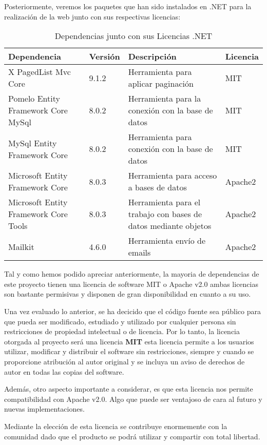 \newpage
Posteriormente, veremos los paquetes que han sido instalados en .NET para la realización de la web junto con sus respectivas licencias:

\begin{table}[H]
    \centering
    \renewcommand{\arraystretch}{1.2} %
    \begin{tabularx}{\textwidth}{X l X l}
        \hline
        \textbf{Dependencia} & \textbf{Versión} & \textbf{Descripción} & \textbf{Licencia} \\
        \hline
        X PagedList Mvc Core & 9.1.2 & Herramienta para aplicar paginación & MIT \\
        Pomelo Entity Framework Core MySql& 8.0.2 & Herramienta para la conexión con la base de datos & MIT \\
        MySql Entity Framework Core & 8.0.2 & Herramienta para conexión con la base de datos & MIT \\
        Microsoft
        Entity Framework Core & 8.0.3 & Herramienta para acceso a bases de datos & Apache2 \\
        Microsoft Entity Framework Core Tools & 8.0.3 & Herramienta para el trabajo con bases de datos mediante objetos & Apache2 \\
        Mailkit & 4.6.0 & Herramienta envío de emails & Apache2 \\
        \hline
    \end{tabularx}
    \caption{Dependencias junto con sus Licencias .NET}
    \label{tab:licencias2}
\end{table}

Tal y como hemos podido apreciar anteriormente, la mayoria de dependencias de este proyecto tienen una licencia de software MIT o Apache v2.0 ambas licencias son bastante permisivas y disponen de gran disponibilidad en cuanto a su uso.

Una vez evaluado lo anterior, se ha decicido que el código fuente sea público para que pueda ser modificado, estudiado y utilizado por cualquier persona sin restricciones de propiedad intelectual o de licencia. Por lo tanto, la licencia otorgada al proyecto será una licencia \textbf{MIT} esta licencia permite a los usuarios utilizar, modificar y distribuir el software sin restricciones, siempre y cuando se proporcione atribución al autor original y se incluya un aviso de derechos de autor en todas las copias del software.

Además, otro aspecto importante a considerar, es que esta licencia nos permite compatibilidad con Apache v2.0. Algo que puede ser ventajoso de cara al futuro y nuevas implementaciones.

Mediante la elección de esta licencia se contribuye enormemente con la comunidad dado que el producto se podrá utilizar y compartir con total libertad.


